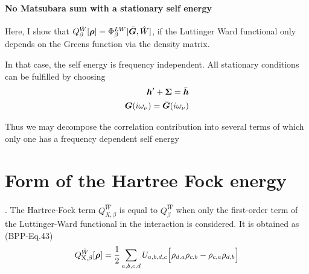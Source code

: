 \documentclass[11pt,a4paper]{report}
\begin{document}
\subsubsection{No Matsubara sum with a stationary self energy}
Here, I show that
$Q^{\hat{W}}_\beta[\bm{\rho}]=\Phi^{LW}_\beta[\bar{\bm{G}},\hat{W}]$,
if the Luttinger Ward functional only depends on the Greens function
via the density matrix.

In that case, the self energy is frequency independent. All stationary
conditions can be fulfilled by choosing
\begin{eqnarray}
\bm{h}'+\bm{\Sigma}=\bar{\bm{h}}
\nonumber\\
\bm{G}(i\omega_\nu)=\bar{\bm{G}}(i\omega_\nu)
\end{eqnarray}

Thus we may decompose the correlation contribution into several terms
of which only one has a frequency dependent self energy


\chapter{Form of the Hartree Fock energy}
\label{app:hfcontrib}.
The Hartree-Fock term $Q^{\hat{W}}_{X,\beta}$ is equal to
$Q^{\hat{W}}_\beta$ when only the first-order term of the
Luttinger-Ward functional in the interaction is considered.  It is
obtained as (BPP-Eq.43)
\begin{eqnarray}
Q_{\text{X},\beta}^{\hat{W}}[\bm{\rho}]
=\frac{1}{2}\sum_{a,b,c,d}U_{a,b,d,c}
\Bigl[\rho_{d,a}\rho_{c,b}-\rho_{c,a}\rho_{d,b}\Bigr]
\end{eqnarray}
\end{document}
